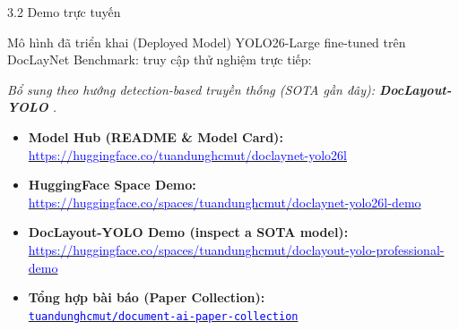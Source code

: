 \documentclass[aspectratio=1610,8pt]{beamer}
\begin{document}
\begin{frame}{3.2 \; Demo trực tuyến}
    \begin{block}{Mô hình đã triển khai (Deployed Model)}
        YOLO26-Large fine-tuned trên DocLayNet Benchmark: truy cập thử nghiệm trực tiếp:
    \end{block}
    \vspace{0.3em}
    \textit{Bổ sung theo hướng detection-based truyền thống (SOTA gần đây): \textbf{DocLayout-YOLO} \cite{dla_2024_arxiv_doclayout_yolo_enhancing_document_layout_analysis_through_diverse_syn}.}
    \vspace{0.5em}
    \begin{itemize}
        \item \textbf{Model Hub (README \& Model Card):}\\
        \href{https://huggingface.co/tuandunghcmut/doclaynet-yolo26l}{\textcolor{blue}{\url{https://huggingface.co/tuandunghcmut/doclaynet-yolo26l}}}
        \vspace{0.4em}
        \item \textbf{HuggingFace Space Demo:}\\
        \href{https://huggingface.co/spaces/tuandunghcmut/doclaynet-yolo26l-demo}{\textcolor{blue}{\url{https://huggingface.co/spaces/tuandunghcmut/doclaynet-yolo26l-demo}}}
        \vspace{0.4em}
        \item \textbf{DocLayout-YOLO Demo (inspect a SOTA model):}\\
        \href{https://huggingface.co/spaces/tuandunghcmut/doclayout-yolo-professional-demo}{\textcolor{blue}{\url{https://huggingface.co/spaces/tuandunghcmut/doclayout-yolo-professional-demo}}}
        \vspace{0.4em}
        \item \textbf{Tổng hợp bài báo (Paper Collection):}\\
        \href{https://github.com/tuandunghcmut/document-ai-paper-collection}{\textcolor{blue}{\nolinkurl{tuandunghcmut/document-ai-paper-collection}}}
    \end{itemize}
\end{frame}
\end{document}
